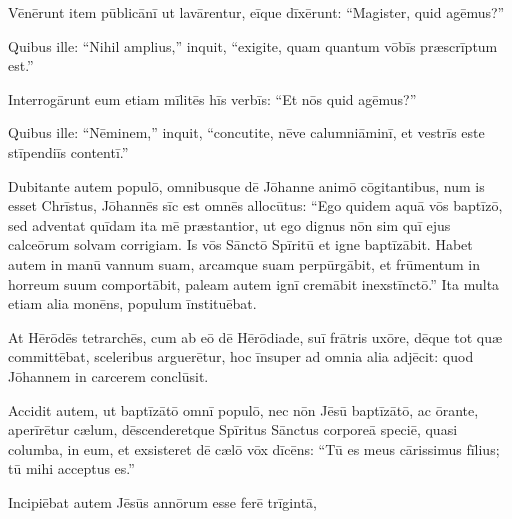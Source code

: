 \Versus Vēnērunt item pūblicānī ut lavārentur, eīque dīxērunt: ``Magister, quid agēmus?''

\Versus Quibus ille: ``Nihil amplius,'' inquit, ``exigite, quam quantum vōbīs præscrīptum est.''

\Versus Interrogārunt eum etiam mīlitēs hīs verbīs: ``Et nōs quid agēmus?''

Quibus ille: ``Nēminem,'' inquit, ``concutite, nēve calumniāminī, et vestrīs este stīpendiīs contentī.''

\Versus Dubitante autem populō, omnibusque dē Jōhanne animō cōgitantibus, num is esset Chrīstus,
\Versus Jōhannēs sīc est omnēs allocūtus: ``Ego quidem aquā vōs baptīzō, sed adventat quīdam ita mē præstantior, ut ego dignus nōn sim quī ejus calceōrum solvam corrigiam. Is vōs Sānctō Spīritū et igne baptīzābit.
\Versus Habet autem in manū vannum suam, arcamque suam perpūrgābit, et frūmentum in horreum suum comportābit, paleam autem ignī cremābit inexstīnctō.''
\Versus Ita multa etiam alia monēns, populum īnstituēbat.

\Versus At Hērōdēs tetrarchēs, cum ab eō dē Hērōdiade, suī frātris uxōre, dēque tot quæ committēbat, sceleribus arguerētur,
\Versus hoc īnsuper ad omnia alia adjēcit: quod Jōhannem in carcerem conclūsit.

\Versus Accidit autem, ut baptīzātō omnī populō, nec nōn Jēsū baptīzātō, ac ōrante, aperīrētur cælum,
\Versus dēscenderetque Spīritus Sānctus corporeā speciē, quasi columba, in eum, et exsisteret dē cælō vōx dīcēns: ``Tū es meus cārissimus fīlius; tū mihi acceptus es.''

\Versus Incipiēbat autem Jēsūs annōrum esse ferē trīgintā,

